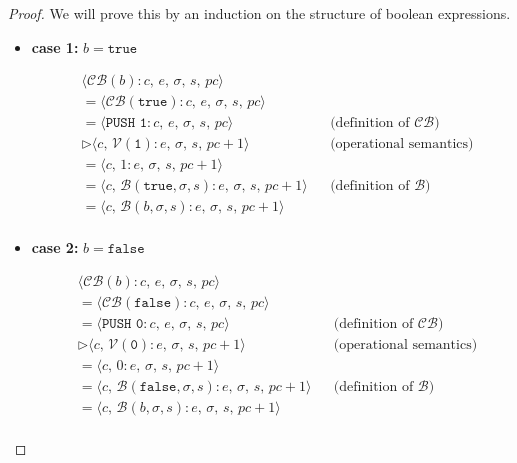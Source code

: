 \documentclass{article}
\begin{document}
\begin{proof}
We will prove this by an induction on the structure of boolean expressions.

\begin{itemize}
    \item \textbf{case 1: } $b = \texttt{true}$

    \[
      \begin{aligned}
        &\langle  \mathcal{CB}(b) : c,\, e,\, \sigma,\, s,\, pc \rangle \\ 
        &= \langle \mathcal{CB}(\texttt{true}) : c,\, e,\, \sigma,\, s,\, pc \rangle \\
        &= \langle \texttt{PUSH 1}   : c,\, e,\, \sigma,\, s,\, pc \rangle 
        && \text{(definition of } \mathcal{CB}\text{)} \\
        &\triangleright \langle c,\, \mathcal{V}(\texttt{1}) : e,\, \sigma,\, s,\, pc+1 \rangle 
        && \text{(operational semantics)} \\
        &= \langle c,\, 1 : e,\, \sigma,\, s,\, pc+1 \rangle  
        \\
        &= \langle c,\, \mathcal{B}(\texttt{true}, \sigma, s) : e,\, \sigma,\, s,\, pc+1 \rangle 
        && \text{(definition of } \mathcal{B}\text{)} \\
        &= \langle c,\, \mathcal{B}(b, \sigma, s) : e,\, \sigma,\, s,\, pc+1 \rangle \\
      \end{aligned}
  \]
    
    \newpage
    \item \textbf{case 2: } $b = \texttt{false}$

    \[
      \begin{aligned}
        &\langle  \mathcal{CB}(b) : c,\, e,\, \sigma,\, s,\, pc \rangle \\ 
        &= \langle \mathcal{CB}(\texttt{false}) : c,\, e,\, \sigma,\, s,\, pc \rangle \\
        &= \langle \texttt{PUSH 0}   : c,\, e,\, \sigma,\, s,\, pc \rangle 
        && \text{(definition of } \mathcal{CB}\text{)} \\
        &\triangleright \langle c,\, \mathcal{V}(\texttt{0}) : e,\, \sigma,\, s,\, pc+1 \rangle 
        && \text{(operational semantics)} \\
        &= \langle c,\, 0 : e,\, \sigma,\, s,\, pc+1 \rangle 
        \\
        &= \langle c,\, \mathcal{B}(\texttt{false}, \sigma, s) : e,\, \sigma,\, s,\, pc+1 \rangle 
        && \text{(definition of } \mathcal{B}\text{)} \\
        &= \langle c,\, \mathcal{B}(b, \sigma, s) : e,\, \sigma,\, s,\, pc+1 \rangle \\
      \end{aligned}
  \]
  

\end{itemize}
\end{proof}
\end{document}
